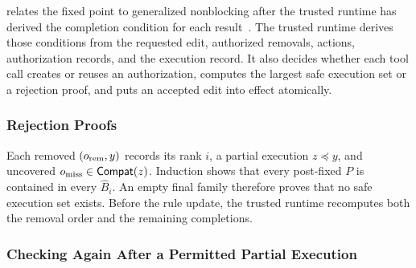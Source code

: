  relates the fixed point to generalized nonblocking after the trusted runtime has derived the completion condition for each result~\cite{dequeiroz2005multitasking,malik2008generalised}.
The trusted runtime derives those conditions from the requested edit, authorized removals, actions, authorization records, and the execution record.
It also decides whether each tool call creates or reuses an authorization, computes the largest safe execution set or a rejection proof, and puts an accepted edit into effect atomically.

\subsubsection{Rejection Proofs}

Each removed \((o_{\rm rem},y)\) records its rank \(i\), a partial execution \(z\preceq y\), and uncovered \(o_{\rm miss}\in\mathsf{Compat}(z)\).
Induction shows that every post-fixed \(P\) is contained in every \(\widehat B_i\).
An empty final family therefore proves that no safe execution set exists.
Before the rule update, the trusted runtime recomputes both the removal order and the remaining completions.

\subsubsection{Checking Again After a Permitted Partial Execution}

